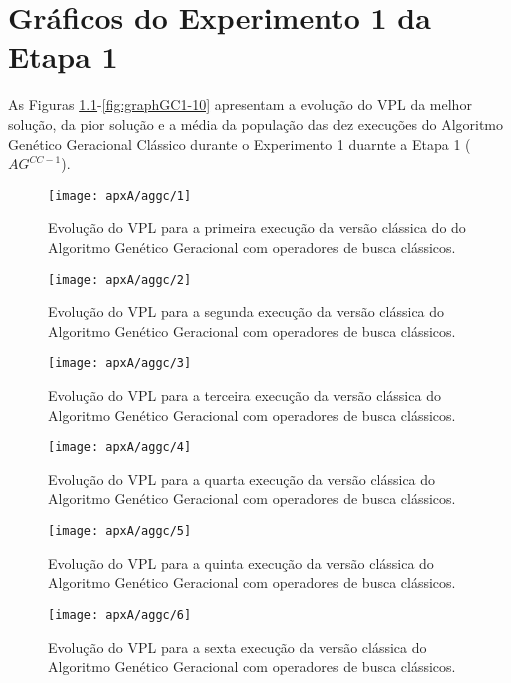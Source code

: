 \chapter{Gráficos do Experimento 1 da Etapa 1}

As Figuras \ref{fig:graphGC1-01}-\ref{fig:graphGC1-10} apresentam a evolução do VPL da melhor solução, da pior solução e a média da população das dez execuções do Algoritmo Genético Geracional Clássico durante o Experimento 1 duarnte a Etapa 1 ($AG^{CC-1}$).

\begin{figure}[H]
\centering
\texttt{[image: apxA/aggc/1]}
\caption{Evolução do VPL para a primeira execução da versão clássica do do Algoritmo Genético Geracional com operadores de busca clássicos.}
\label{fig:graphGC1-01}
\end{figure}

\begin{figure}[H]
\centering
\texttt{[image: apxA/aggc/2]}
\caption{Evolução do VPL para a segunda execução da versão clássica do Algoritmo Genético Geracional com operadores de busca clássicos.}
\label{fig:graphGC1-02}
\end{figure}

\begin{figure}[H]
\centering
\texttt{[image: apxA/aggc/3]}
\caption{Evolução do VPL para a terceira execução da versão clássica do Algoritmo Genético Geracional com operadores de busca clássicos.}
\label{fig:graphGC1-03}
\end{figure}

\begin{figure}[H]
\centering
\texttt{[image: apxA/aggc/4]}
\caption{Evolução do VPL para a quarta execução da versão clássica do Algoritmo Genético Geracional com operadores de busca clássicos.}
\label{fig:graphGC1-04}
\end{figure}

\begin{figure}[htb]
\centering
\texttt{[image: apxA/aggc/5]}
\caption{Evolução do VPL para a quinta execução da versão clássica do Algoritmo Genético Geracional com operadores de busca clássicos.}
\label{fig:graphGC1-05}
\end{figure}


\begin{figure}[H]
\centering
\texttt{[image: apxA/aggc/6]}
\caption{Evolução do VPL para a sexta execução da versão clássica do Algoritmo Genético Geracional com operadores de busca clássicos.}
\label{fig:graphGC1-06}
\end{figure}

